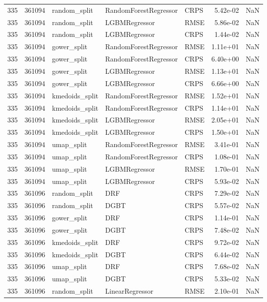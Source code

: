 \begin{tabular}{rrlllrr}
335 & 361094 & random\_split & RandomForestRegressor & CRPS & 5.42e-02 & NaN \\
335 & 361094 & random\_split & LGBMRegressor & RMSE & 5.86e-02 & NaN \\
335 & 361094 & random\_split & LGBMRegressor & CRPS & 1.44e-02 & NaN \\
335 & 361094 & gower\_split & RandomForestRegressor & RMSE & 1.11e+01 & NaN \\
335 & 361094 & gower\_split & RandomForestRegressor & CRPS & 6.40e+00 & NaN \\
335 & 361094 & gower\_split & LGBMRegressor & RMSE & 1.13e+01 & NaN \\
335 & 361094 & gower\_split & LGBMRegressor & CRPS & 6.66e+00 & NaN \\
335 & 361094 & kmedoids\_split & RandomForestRegressor & RMSE & 1.52e+01 & NaN \\
335 & 361094 & kmedoids\_split & RandomForestRegressor & CRPS & 1.14e+01 & NaN \\
335 & 361094 & kmedoids\_split & LGBMRegressor & RMSE & 2.05e+01 & NaN \\
335 & 361094 & kmedoids\_split & LGBMRegressor & CRPS & 1.50e+01 & NaN \\
335 & 361094 & umap\_split & RandomForestRegressor & RMSE & 3.41e-01 & NaN \\
335 & 361094 & umap\_split & RandomForestRegressor & CRPS & 1.08e-01 & NaN \\
335 & 361094 & umap\_split & LGBMRegressor & RMSE & 1.70e-01 & NaN \\
335 & 361094 & umap\_split & LGBMRegressor & CRPS & 5.93e-02 & NaN \\
335 & 361096 & random\_split & DRF & CRPS & 7.29e-02 & NaN \\
335 & 361096 & random\_split & DGBT & CRPS & 5.57e-02 & NaN \\
335 & 361096 & gower\_split & DRF & CRPS & 1.14e-01 & NaN \\
335 & 361096 & gower\_split & DGBT & CRPS & 7.48e-02 & NaN \\
335 & 361096 & kmedoids\_split & DRF & CRPS & 9.72e-02 & NaN \\
335 & 361096 & kmedoids\_split & DGBT & CRPS & 6.44e-02 & NaN \\
335 & 361096 & umap\_split & DRF & CRPS & 7.68e-02 & NaN \\
335 & 361096 & umap\_split & DGBT & CRPS & 5.33e-02 & NaN \\
335 & 361096 & random\_split & LinearRegressor & RMSE & 2.10e-01 & NaN \\

\end{tabular}
